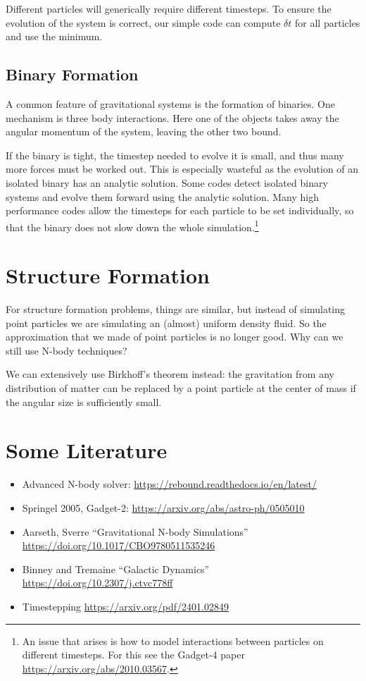 \documentclass[12pt]{article}
\begin{document}
Different particles will generically require different timesteps. To ensure the evolution of the system is correct, our simple code can compute $\delta t$ for all particles and use the minimum.

\subsection{Binary Formation}

A common feature of gravitational systems is the formation of binaries. One mechanism is three body interactions. Here one of the objects takes away the angular momentum of the system, leaving the other two bound.

If the binary is tight, the timestep needed to evolve it is small, and thus many more forces must be worked out. This is especially wasteful as the evolution of an isolated binary has an analytic solution. Some codes detect isolated binary systems and evolve them forward using the analytic solution. Many high performance codes allow the timesteps for each particle to be set individually, so that the binary does not slow down the whole simulation.\footnote{An issue that arises is how to model interactions between particles on different timesteps. For this see the Gadget-4 paper \url{https://arxiv.org/abs/2010.03567}.}

\section{Structure Formation}

For structure formation problems, things are similar, but instead of simulating point particles we are simulating an (almost) uniform density fluid. So the approximation that we made of point particles is no longer good. Why can we still use N-body techniques?

We can extensively use Birkhoff's theorem instead: the gravitation from any distribution of matter can be replaced by a point particle at the center of mass if the angular size is sufficiently small.

\section{Some Literature}
\begin{itemize}

\item Advanced N-body solver: \url{https://rebound.readthedocs.io/en/latest/}

\item Springel 2005, Gadget-2: \url{https://arxiv.org/abs/astro-ph/0505010}

\item Aarseth, Sverre ``Gravitational N-body Simulations'' \url{https://doi.org/10.1017/CBO9780511535246}

\item Binney and Tremaine ``Galactic Dynamics'' \url{https://doi.org/10.2307/j.ctvc778ff}

\item Timestepping \url{https://arxiv.org/pdf/2401.02849}
\end{itemize}
\end{document}

